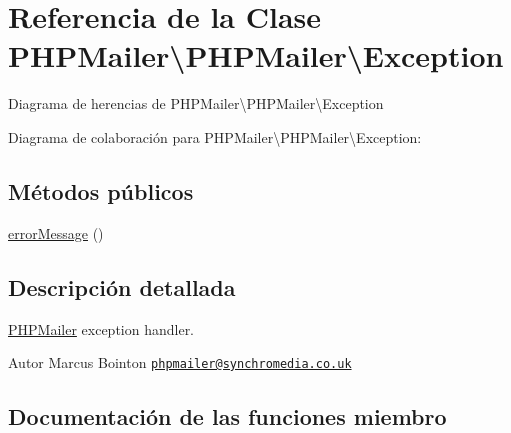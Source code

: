\hypertarget{classPHPMailer_1_1PHPMailer_1_1Exception}{}\section{Referencia de la Clase P\+H\+P\+Mailer\textbackslash{}P\+H\+P\+Mailer\textbackslash{}Exception}
\label{classPHPMailer_1_1PHPMailer_1_1Exception}


Diagrama de herencias de P\+H\+P\+Mailer\textbackslash{}P\+H\+P\+Mailer\textbackslash{}Exception


Diagrama de colaboración para P\+H\+P\+Mailer\textbackslash{}P\+H\+P\+Mailer\textbackslash{}Exception\+:
\subsection*{Métodos públicos}
\begin{DoxyCompactItemize}
\item 
\hyperlink{classPHPMailer_1_1PHPMailer_1_1Exception_aad2f4255c5653a2073812f40733ded4e}{error\+Message} ()
\end{DoxyCompactItemize}


\subsection{Descripción detallada}
\hyperlink{classPHPMailer_1_1PHPMailer_1_1PHPMailer}{P\+H\+P\+Mailer} exception handler.

\begin{DoxyAuthor}{Autor}
Marcus Bointon \href{mailto:phpmailer@synchromedia.co.uk}{\tt phpmailer@synchromedia.\+co.\+uk} 
\end{DoxyAuthor}


\subsection{Documentación de las funciones miembro}
\mbox{\label{classPHPMailer_1_1PHPMailer_1_1Exception_aad2f4255c5653a2073812f40733ded4e}} 
